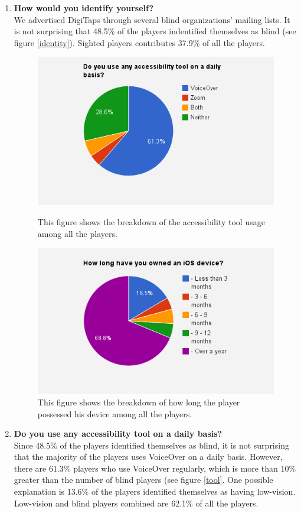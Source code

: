 \begin{enumerate}
  \item \textbf{How would you identify yourself?} \\
  We advertised DigiTaps through several blind organizations' mailing lists. It is not surprising that 48.5\% of the players indentified themselves as blind (see figure \ref{identity}). Sighted players contributes 37.9\% of all the players.

\begin{figure}[!htbp]
  \centering
  \includegraphics[width=1.0\textwidth]{figures/chart-tools.png}
  \caption{This figure shows the breakdown of the accessibility tool usage among all the players.}
  \label{tool}
  \includegraphics[width=1.0\textwidth]{figures/chart-own.png}
  \caption{This figure shows the breakdown of how long the player possessed his device among all the players.}
  \label{own}
\end{figure}

  \item \textbf{Do you use any accessibility tool on a daily basis?} \\
  Since 48.5\% of the players identified themselves as blind, it is not surprising that the majority of the players uses VoiceOver on a daily basis. However, there are 61.3\% players who use VoiceOver regularly, which is more than 10\% greater than the number of blind players (see figure \ref{tool}. One possible explanation is  13.6\% of the players identified themselves as having low-vision. Low-vision and blind players combined are 62.1\% of all the players.


\end{enumerate}
